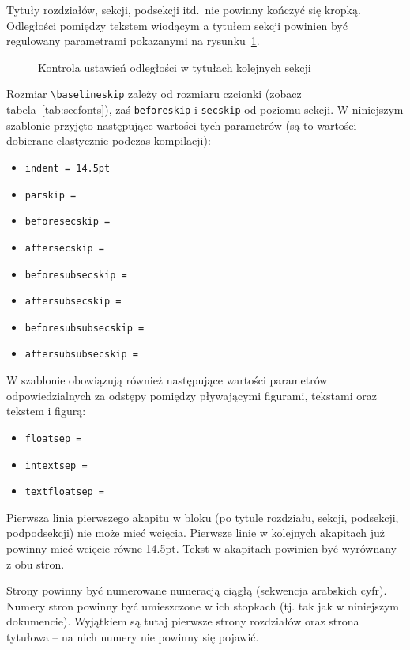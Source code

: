 Tytuły rozdziałów, sekcji, podsekcji itd.\ nie powinny kończyć się kropką. Odległości pomiędzy tekstem wiodącym a tytułem sekcji powinien być regulowany parametrami pokazanymi na rysunku~\ref{fig:LaySec}. 
\begin{figure}[t]
\runinheadfalse
\drawparameterstrue
\drawheading{\Large\bfseries}
\caption{Kontrola ustawień odległości w tytułach kolejnych sekcji} 
\label{fig:LaySec}
\end{figure}
Rozmiar \verb?\baselineskip? zależy od rozmiaru czcionki (zobacz tabela~\ref{tab:secfonts}), zaś \texttt{beforeskip} i \texttt{secskip} od poziomu sekcji. W niniejszym szablonie przyjęto następujące wartości tych parametrów (są to wartości dobierane elastycznie podczas kompilacji):
\begin{itemize}
\item \texttt{indent = 14.5pt}
\item \texttt{parskip = \printlength{\parskip}}
\item \texttt{beforesecskip = \printlength{\beforesecskip}}
\item \texttt{aftersecskip = \printlength{\aftersecskip}}
\item \texttt{beforesubsecskip = \printlength{\beforesubsecskip}}
\item \texttt{aftersubsecskip = \printlength{\aftersubsecskip}}
\item \texttt{beforesubsubsecskip = \printlength{\beforesubsecskip}}
\item \texttt{aftersubsubsecskip = \printlength{\aftersubsecskip}}
\end{itemize}

W szablonie obowiązują również następujące wartości parametrów odpowiedzialnych za odstępy pomiędzy pływającymi figurami, tekstami oraz tekstem i figurą:
\begin{itemize}
\item \texttt{floatsep = \printlength{\floatsep}}
\item \texttt{intextsep = \printlength{\intextsep}}
\item \texttt{textfloatsep = \printlength{\textfloatsep}}
\end{itemize}

Pierwsza linia pierwszego akapitu w bloku (po tytule rozdziału, sekcji, podsekcji, podpodsekcji) nie może mieć wcięcia. Pierwsze linie w kolejnych akapitach już powinny mieć wcięcie równe 14.5pt. Tekst w akapitach powinien być wyrównany z obu stron. 


Strony powinny być numerowane numeracją ciągłą (sekwencja arabskich cyfr). Numery stron powinny być umieszczone w ich stopkach (tj. tak jak w niniejszym dokumencie). Wyjątkiem są tutaj pierwsze strony rozdziałów oraz strona tytułowa -- na nich numery nie powinny się pojawić.

